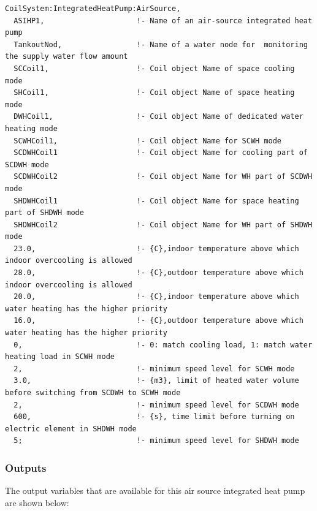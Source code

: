 \begin{lstlisting}
CoilSystem:IntegratedHeatPump:AirSource,
  ASIHP1,                     !- Name of an air-source integrated heat pump
  TankoutNod,                 !- Name of a water node for  monitoring the supply water flow amount
  SCCoil1,                    !- Coil object Name of space cooling mode
  SHCoil1,                    !- Coil object Name of space heating mode
  DWHCoil1,                   !- Coil object Name of dedicated water heating mode
  SCWHCoil1,                  !- Coil object Name for SCWH mode
  SCDWHCoil1                  !- Coil object Name for cooling part of SCDWH mode
  SCDWHCoil2                  !- Coil object Name for WH part of SCDWH mode
  SHDWHCoil1                  !- Coil object Name for space heating part of SHDWH mode
  SHDWHCoil2                  !- Coil object Name for WH part of SHDWH mode
  23.0,                       !- {C},indoor temperature above which indoor overcooling is allowed
  28.0,                       !- {C},outdoor temperature above which indoor overcooling is allowed
  20.0,                       !- {C},indoor temperature above which water heating has the higher priority
  16.0,                       !- {C},outdoor temperature above which water heating has the higher priority
  0,                          !- 0: match cooling load, 1: match water heating load in SCWH mode
  2,                          !- minimum speed level for SCWH mode
  3.0,                        !- {m3}, limit of heated water volume before switching from SCDWH to SCWH mode
  2,                          !- minimum speed level for SCDWH mode
  600,                        !- {s}, time limit before turning on electric element in SHDWH mode
  5;                          !- minimum speed level for SHDWH mode
\end{lstlisting}

\subsubsection{Outputs}\label{outputs-011}

The output variables that are available for this air source integrated heat pump are shown below:


